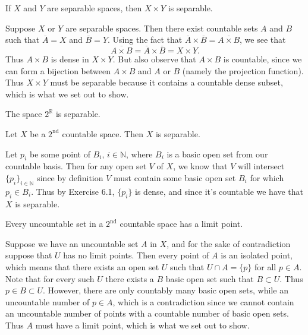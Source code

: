 \documentclass[a4paper,12pt,twoside]{hmcpset}
\begin{document}
\begin{problem}[Theorem 6.5]
    If $X$ and $Y$ are separable spaces, then $X \times Y$ is separable.
\end{problem}

\begin{solution}
    Suppose $X$ or $Y$ are separable spaces. Then there exist countable sets 
    $A$ and $B$ such that $\overline{A} = X$ and $\overline{B} = Y$. 
    Using the fact that $\overline{A} \times \overline{B} = \overline{A \times B}$,
    we see that
    $$
    \overline{A \times B} = \overline{A} \times \overline{B} = X \times Y.
    $$
    Thus $A \times B$ is dense in $X \times Y$. But also observe that 
    $A \times B$ is countable, since we can form a bijection between $A 
    \times B$ and $A$ or $B$ (namely the projection function). Thus $X \times Y$
    must be separable because it contains a countable dense subset, which is 
    what we set out to show.
\end{solution}

\begin{problem}[Theorem 6.6]
    The space $2^{\mathbb{R}}$ is separable.
\end{problem}

\begin{solution}
        
\end{solution}

\begin{problem}[Theorem 6.9]
    Let $X$ be a $2^{\text{nd}}$ countable space. Then $X$ is separable.
\end{problem}

\begin{solution}
    Let $p_i$ be some point of $B_i$, $i \in \mathbb{N}$, where $B_i$ is a basic open set 
    from our countable basis. Then for any open set $V$ of $X$, 
    we know that $V$ will intersect $\{p_i\}_{i \in \mathbb{N}}$ 
    since by definition $V$ must contain some basic open set $B_i$ for 
    which $p_i \in B_i$. Thus by Exercise 6.1, $\{p_i\}$ is dense, and 
    since it's countable we have that $X$ is separable.
\end{solution}

\begin{problem}[Theorem 6.11]
    Every uncountable set in a $2^{\text{nd}}$ countable space has a limit point. 
\end{problem}

\begin{solution}
    Suppose we have an uncountable set $A$ in $X$, and for the sake of
    contradiction suppose that $U$ has no limit points. Then every point
    of $A$ is an isolated point, which means that there exists an open set 
    $U$ such that $U \cap A = \{p\}$ for all $p \in A$. Note that
    for every such $U$ there exists a $B$ basic open set such that $B \subset U$.
    Thus $p \in B \subset U$. 
    However, there are only countably many basic open sets, while an uncountable 
    number of $p \in A$, which is a contradiction since we cannot contain an uncountable 
    number of points with a countable number of basic open sets. Thus $A$ 
    must have a limit point, which is what we set out to show. 
\end{solution}
\end{document}
